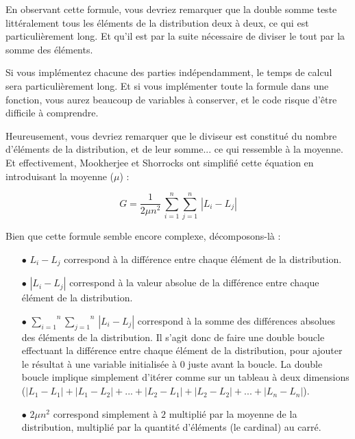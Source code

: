 \documentclass[11pt,a4paper]{article}
\begin{document}
En observant cette formule, vous devriez remarquer que la double somme teste littéralement tous les éléments de la distribution deux à deux, ce qui est particulièrement long.
Et qu'il est par la suite nécessaire de diviser le tout par la somme des éléments.

\bigskip

Si vous implémentez chacune des parties indépendamment, le temps de calcul sera particulièrement long.
Et si vous implémenter toute la formule dans une fonction, vous aurez beaucoup de variables à conserver, et le code risque d'être difficile à comprendre.

\bigskip

Heureusement, vous devriez remarquer que le diviseur est constitué du nombre d'éléments de la distribution, et de leur somme... ce qui ressemble à la moyenne.
Et effectivement, Mookherjee et Shorrocks ont simplifié cette équation en introduisant la moyenne ($ \mu $) :

\begin{center}
\begin{equation*}
G = \frac{1}{2 \mu n^{2}} \, \overset{n}{\underset{i = 1}{\sum}} \overset{n}{\underset{j = 1}{\sum}} \, | L_{i} - L_{j} |
\end{equation*}
\end{center}

Bien que cette formule semble encore complexe, décomposons-là :

\begin{itemize}
\item[$\bullet$] $ L_{i} - L_{j} $ correspond à la différence entre chaque élément de la distribution.

\item[$\bullet$] $ | L_{i} - L_{j} | $ correspond à la valeur absolue de la différence entre chaque élément de la distribution.

\item[$\bullet$] $ \overset{n}{\underset{i = 1}{\sum}} \overset{n}{\underset{j = 1}{\sum}} \, | L_{i} - L_{j} | $ correspond à la somme des différences absolues des éléments de la distribution. Il s'agit donc de faire une double boucle effectuant la différence entre chaque élément de la distribution, pour ajouter le résultat à une variable initialisée à $ 0 $ juste avant la boucle. La double boucle implique simplement d'itérer comme sur un tableau à deux dimensions ($ | L_{1} - L_{1} | + | L_{1} - L_{2} | + ... + | L_{2} - L_{1} | + | L_{2} - L_{2} | + ... + | L_{n} - L_{n} | $).

\item[$\bullet$] $  2 \mu n^{2} $ correspond simplement à $ 2 $ multiplié par la moyenne de la distribution, multiplié par la quantité d'éléments (le cardinal) au carré.
\end{itemize}
\end{document}
